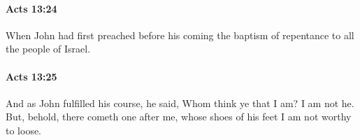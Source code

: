 		\paragraph{Acts 13:24} %
			\label{ACTS-13-24}

			When John had first preached before his coming the baptism of repentance to all the people of Israel.

			\begin{framed}
			\scriptsize
				\begin{compactdesc}
					\item[SBLG] 
				\end{compactdesc}
			\end{framed}

		\paragraph{Acts 13:25} %
			\label{ACTS-13-25}

			And as John fulfilled his course, he said, Whom think ye that I am?  I am not he.  But, behold, there cometh one after me, whose shoes of his feet I am not worthy to loose.

